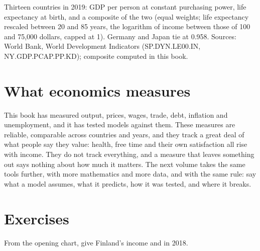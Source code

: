 \begin{omfigure}
\small
{}

\medskip
{\small Thirteen countries in 2019: GDP per person at constant purchasing power, life expectancy at birth, and a composite of the two (equal weights; life
expectancy rescaled between 20 and 85 years, the logarithm of income between those of 100 and 75,000 dollars, capped at 1). Germany and Japan tie at 0.958. Sources: World Bank,
World Development Indicators (SP.DYN.LE00.IN, NY.GDP.PCAP.PP.KD); composite computed in this book.}
\end{omfigure}

\section{What economics measures}\label{sec:g12:income-and-wellbeing:closing}

This book has measured output, prices, wages, trade, debt, inflation and unemployment, and it has tested models against them. These measures are reliable, comparable across
countries and years, and they track a great deal of what people say they value: health, free time and their own satisfaction all rise with income. They do not track
everything, and a measure that leaves something out says nothing about how much it matters. The next volume takes the same tools further, with more mathematics and more data,
and with the same rule: say what a model assumes, what it predicts, how it was tested, and where it breaks.

\section{Exercises}

\begin{exercise}[$\star$]\label{exo:g12:income-and-wellbeing:1}
From the opening chart, give Finland's income and  in 2018.
\end{exercise}

